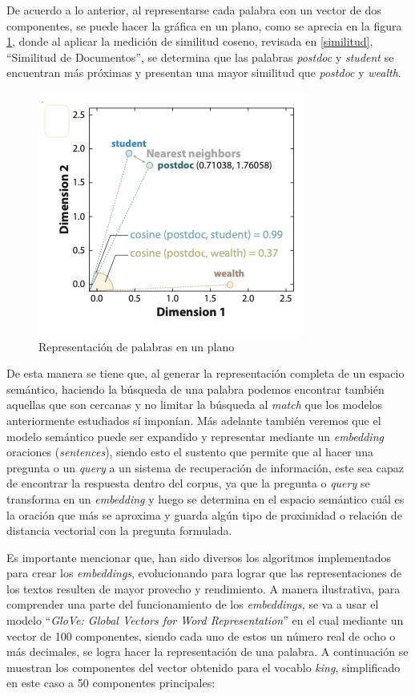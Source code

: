 \documentclass[
  12pt,
  openany]{book}
\begin{document}
De acuerdo a lo anterior, al representarse cada palabra con un vector de dos componentes, se puede hacer la gráfica en un plano, como se aprecia en la figura \ref{fig:embeddingimg}, donde al aplicar la medición de similitud coseno, revisada en \ref{similitud}, ``Similitud de Documentos'', se determina que las palabras \emph{postdoc} y \emph{student} se encuentran más próximas y presentan una mayor similitud que \emph{postdoc} y \emph{wealth}.

\begin{figure}

{\centering \includegraphics[width=0.55\linewidth]{images/03-marco-teorico/word_vec} 

}

\caption{Representación de palabras en un plano}\label{fig:embeddingimg}
\end{figure}

De esta manera se tiene que, al generar la representación completa de un espacio semántico, haciendo la búsqueda de una palabra podemos encontrar también aquellas que son cercanas y no limitar la búsqueda al \emph{match} que los modelos anteriormente estudiados sí imponían. Más adelante también veremos que el modelo semántico puede ser expandido y representar mediante un \emph{embedding} oraciones (\emph{sentences}), siendo esto el sustento que permite que al hacer una pregunta o un \emph{query} a un sistema de recuperación de información, este sea capaz de encontrar la respuesta dentro del corpus, ya que la pregunta o \emph{query} se transforma en un \emph{embedding} y luego se determina en el espacio semántico cuál es la oración que más se aproxima y guarda algún tipo de proximidad o relación de distancia vectorial con la pregunta formulada.~

Es importante mencionar que, han sido diversos los algoritmos implementados para crear los \emph{embeddings}, evolucionando para lograr que las representaciones de los textos resulten de mayor provecho y rendimiento. A manera ilustrativa, para comprender una parte del funcionamiento de los \emph{embeddings,} se va a usar el modelo ``\emph{GloVe: Global Vectors for Word Representation}'' \citep{pennington2014} en el cual mediante un vector de 100 componentes, siendo cada uno de estos un número real de ocho o más decimales, se logra hacer la representación de una palabra. A continuación se muestran los componentes del vector obtenido para el vocablo \emph{king}, simplificado en este caso a 50 componentes principales:
\end{document}
